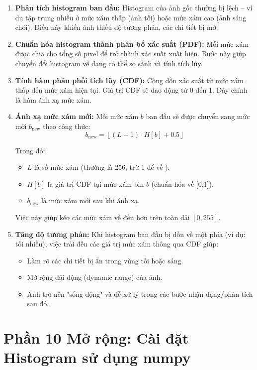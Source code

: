 \documentclass[11pt]{article}
\begin{document}
\begin{enumerate}
  \item \textbf{Phân tích histogram ban đầu:} Histogram của ảnh gốc thường bị lệch – ví dụ tập trung nhiều ở mức xám thấp (ảnh tối) hoặc mức xám cao (ảnh sáng chói). Điều này khiến ảnh thiếu độ tương phản, các chi tiết bị mờ.

  \item \textbf{Chuẩn hóa histogram thành phân bố xác suất (PDF):} Mỗi mức xám được chia cho tổng số pixel để trở thành xác suất xuất hiện. Bước này giúp chuyển đổi histogram về dạng có thể so sánh và tính tích lũy.

  \item \textbf{Tính hàm phân phối tích lũy (CDF):} Cộng dồn xác suất từ mức xám thấp đến mức xám hiện tại. Giá trị CDF sẽ dao động từ 0 đến 1. Đây chính là hàm ánh xạ mức xám.

  \item \textbf{Ánh xạ mức xám mới:} Mỗi mức xám $b$ ban đầu sẽ được chuyển sang mức mới $b_{\text{new}}$ theo công thức:
  \[
  b_{\text{new}} = \left\lfloor (L - 1) \cdot H[b] + 0.5 \right\rfloor
  \]

Trong đó:
\begin{itemize}
  \item $L$ là số mức xám (thường là 256, trừ 1 để về ).
  \item $H[b]$ là giá trị CDF tại mức xám bin $b$ (chuẩn hóa về [0,1]).
  \item $b_{\text{new}}$ là mức xám mới sau khi ánh xạ.
\end{itemize}
 Việc này giúp kéo các mức xám về đều hơn trên toàn dải $[0, 255]$.

  \item \textbf{Tăng độ tương phản:} 
  Khi histogram ban đầu bị dồn về một phía (ví dụ: tối nhiều), việc trải đều các giá trị mức xám thông qua CDF giúp:
  \begin{itemize}
    \item Làm rõ các chi tiết bị ẩn trong vùng tối hoặc sáng.
    \item Mở rộng dải động (dynamic range) của ảnh.
    \item Ảnh trở nên "sống động" và dễ xử lý trong các bước nhận dạng/phân tích sau đó.
  \end{itemize}
\end{enumerate}

\section{Phần 10 Mở rộng: Cài đặt Histogram sử dụng numpy}
\end{document}
